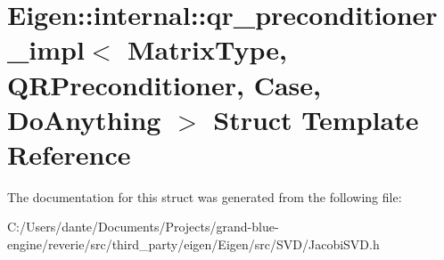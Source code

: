 \hypertarget{struct_eigen_1_1internal_1_1qr__preconditioner__impl}{}\section{Eigen\+::internal\+::qr\+\_\+preconditioner\+\_\+impl$<$ Matrix\+Type, Q\+R\+Preconditioner, Case, Do\+Anything $>$ Struct Template Reference}
\label{struct_eigen_1_1internal_1_1qr__preconditioner__impl}


The documentation for this struct was generated from the following file\+:\begin{DoxyCompactItemize}
\item 
C\+:/\+Users/dante/\+Documents/\+Projects/grand-\/blue-\/engine/reverie/src/third\+\_\+party/eigen/\+Eigen/src/\+S\+V\+D/Jacobi\+S\+V\+D.\+h\end{DoxyCompactItemize}
